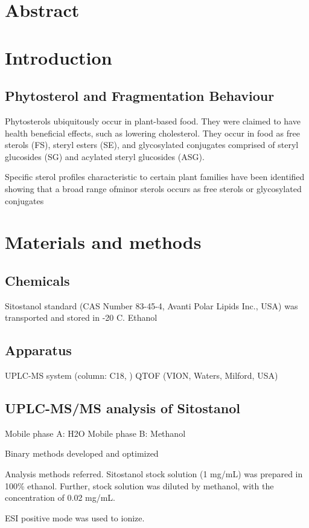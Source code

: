 \section{Abstract}

\section{Introduction}
\subsection{Phytosterol and Fragmentation Behaviour}
Phytosterols ubiquitously occur in plant-based food\cite{sterolmsms}. They were claimed to have health beneficial effects, such as lowering cholesterol. They occur in food as free sterols (FS), steryl esters (SE), and glycosylated conjugates comprised of steryl glucosides (SG) and acylated steryl glucosides (ASG).

Specific sterol profiles characteristic to certain plant families have been identified showing that a broad range ofminor sterols occurs as free sterols or glycosylated conjugates


\section{Materials and methods}
\subsection{Chemicals}
Sitostanol standard (CAS Number 83-45-4, Avanti Polar Lipids Inc., USA) was transported and stored in -20 \degree C. Ethanol

\subsection{Apparatus}
UPLC-MS system (column: C18,  )
QTOF (VION, Waters, Milford, USA)

\subsection{UPLC-MS/MS analysis of Sitostanol}
\cite{doi:10.1021/jf501509m}
Mobile phase A: H2O
Mobile phase B: Methanol

Binary methods developed and optimized 

Analysis methods referred\cite{sterolmsms}. Sitostanol stock solution (1 mg/mL) was prepared in 100\% ethanol. Further, stock solution was diluted by methanol, with the concentration of 0.02 mg/mL. 

ESI positive mode was used to ionize.
